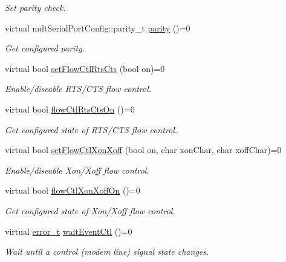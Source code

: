 \begin{DoxyCompactItemize}
\begin{DoxyCompactList}\small\item\em Set parity check. \end{DoxyCompactList}\item 
virtual mdtSerialPortConfig::parity\_\-t \hyperlink{classmdt_abstract_serial_port_ac361191b58789065fcea742019b958f9}{parity} ()=0
\begin{DoxyCompactList}\small\item\em Get configured parity. \end{DoxyCompactList}\item 
virtual bool \hyperlink{classmdt_abstract_serial_port_af01806f53cfc5ef90b34c0645cee3bdf}{setFlowCtlRtsCts} (bool on)=0
\begin{DoxyCompactList}\small\item\em Enable/diseable RTS/CTS flow control. \end{DoxyCompactList}\item 
virtual bool \hyperlink{classmdt_abstract_serial_port_a7a1163b4d44d80369bd56c65af7942ad}{flowCtlRtsCtsOn} ()=0
\begin{DoxyCompactList}\small\item\em Get configured state of RTS/CTS flow control. \end{DoxyCompactList}\item 
virtual bool \hyperlink{classmdt_abstract_serial_port_a05b35143f7b048ebcb2295fdc2ac5013}{setFlowCtlXonXoff} (bool on, char xonChar, char xoffChar)=0
\begin{DoxyCompactList}\small\item\em Enable/diseable Xon/Xoff flow control. \end{DoxyCompactList}\item 
virtual bool \hyperlink{classmdt_abstract_serial_port_a80074ba4e5bf44c3e2aebb82214499ee}{flowCtlXonXoffOn} ()=0
\begin{DoxyCompactList}\small\item\em Get configured state of Xon/Xoff flow control. \end{DoxyCompactList}\item 
virtual \hyperlink{classmdt_abstract_port_ad4121bb930c95887e77f8bafa065a85e}{error\_\-t} \hyperlink{classmdt_abstract_serial_port_a146bf17f4f11c173e9b123bace0f2ddf}{waitEventCtl} ()=0
\begin{DoxyCompactList}\small\item\em Wait until a control (modem line) signal state changes. \end{DoxyCompactList}\item 

\end{DoxyCompactItemize}
